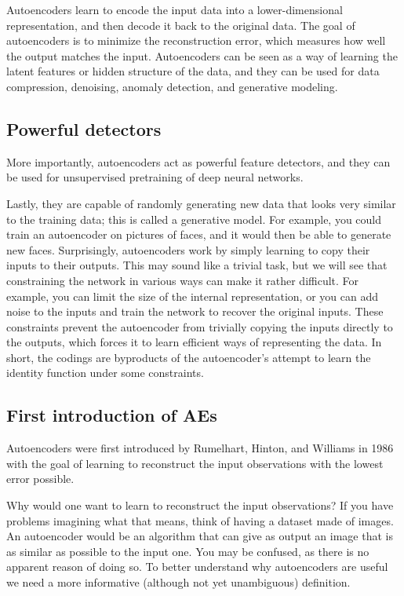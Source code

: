\documentclass[%
oneside,                 %
final,                   %
10pt]{article}
\begin{document}
Autoencoders learn to encode the
input data into a lower-dimensional representation, and then decode it
back to the original data. The goal of autoencoders is to minimize the
reconstruction error, which measures how well the output matches the
input. Autoencoders can be seen as a way of learning the latent
features or hidden structure of the data, and they can be used for
data compression, denoising, anomaly detection, and generative
modeling.

\subsection{Powerful detectors}

More importantly, autoencoders act as powerful feature detectors, and
they can be used for unsupervised pretraining of deep neural networks.

Lastly, they are capable of randomly generating new data that looks
very similar to the training data; this is called a generative
model. For example, you could train an autoencoder on pictures of
faces, and it would then be able to generate new faces.  Surprisingly,
autoencoders work by simply learning to copy their inputs to their
outputs. This may sound like a trivial task, but we will see that
constraining the network in various ways can make it rather
difficult. For example, you can limit the size of the internal
representation, or you can add noise to the inputs and train the
network to recover the original inputs. These constraints prevent the
autoencoder from trivially copying the inputs directly to the outputs,
which forces it to learn efficient ways of representing the data. In
short, the codings are byproducts of the autoencoder’s attempt to
learn the identity function under some constraints.

\subsection{First introduction of AEs}

Autoencoders were first introduced by Rumelhart, Hinton, and Williams
in 1986 with the goal of learning to reconstruct the input
observations with the lowest error possible.

Why would one want to learn to reconstruct the input observations? If
you have problems imagining what that means, think of having a dataset
made of images. An autoencoder would be an algorithm that can give as
output an image that is as similar as possible to the input one. You
may be confused, as there is no apparent reason of doing so. To better
understand why autoencoders are useful we need a more informative
(although not yet unambiguous) definition.
\end{document}
